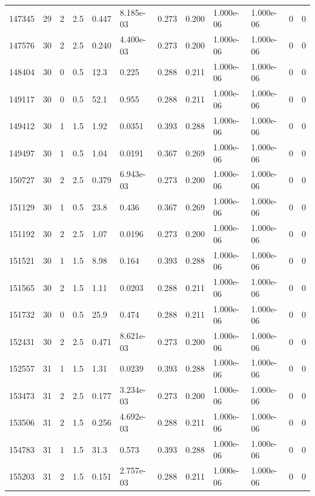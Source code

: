 \documentclass[preview]{standalone}
\begin{document}
{{{{{{{\begin{tabular}{L{1.2cm}C{1.2cm} C{0.3cm}C{0.5cm} C{1.4cm}C{1.4cm} C{1.4cm}C{1.4cm} C{1.6cm}C{1.6cm} C{1.6cm}C{1.6cm}}
  147345  &    29  & 2     & 2.5 &  0.447  & 8.185e-03  &  0.273&   0.200& 1.000e-06 & 1.000e-06   &  0 & 0  \\ 
  147576  &    30  & 2     & 2.5 &  0.240  & 4.400e-03  &  0.273&   0.200& 1.000e-06 & 1.000e-06   &  0 & 0  \\ 
  148404  &    30  & 0     & 0.5 &  12.3  & 0.225  &  0.288&   0.211& 1.000e-06 & 1.000e-06   &  0 & 0  \\ 
  149117  &    30  & 0     & 0.5 &  52.1  & 0.955  &  0.288&   0.211& 1.000e-06 & 1.000e-06   &  0 & 0  \\ 
  149412  &    30  & 1     & 1.5 &  1.92  & 0.0351  &  0.393&   0.288& 1.000e-06 & 1.000e-06   &  0 & 0  \\ 
  149497  &    30  & 1     & 0.5 &  1.04  & 0.0191  &  0.367&   0.269& 1.000e-06 & 1.000e-06   &  0 & 0  \\ 
  150727  &    30  & 2     & 2.5 &  0.379  & 6.943e-03  &  0.273&   0.200& 1.000e-06 & 1.000e-06   &  0 & 0  \\ 
  151129  &    30  & 1     & 0.5 &  23.8  & 0.436  &  0.367&   0.269& 1.000e-06 & 1.000e-06   &  0 & 0  \\ 
  151192  &    30  & 2     & 2.5 &  1.07  & 0.0196  &  0.273&   0.200& 1.000e-06 & 1.000e-06   &  0 & 0  \\ 
  151521  &    30  & 1     & 1.5 &  8.98  & 0.164  &  0.393&   0.288& 1.000e-06 & 1.000e-06   &  0 & 0  \\ 
  151565  &    30  & 2     & 1.5 &  1.11  & 0.0203  &  0.288&   0.211& 1.000e-06 & 1.000e-06   &  0 & 0  \\ 
  151732  &    30  & 0     & 0.5 &  25.9  & 0.474  &  0.288&   0.211& 1.000e-06 & 1.000e-06   &  0 & 0  \\ 
  152431  &    30  & 2     & 2.5 &  0.471  & 8.621e-03  &  0.273&   0.200& 1.000e-06 & 1.000e-06   &  0 & 0  \\ 
  152557  &    31  & 1     & 1.5 &  1.31  & 0.0239  &  0.393&   0.288& 1.000e-06 & 1.000e-06   &  0 & 0  \\ 
  153473  &    31  & 2     & 2.5 &  0.177  & 3.234e-03  &  0.273&   0.200& 1.000e-06 & 1.000e-06   &  0 & 0  \\ 
  153506  &    31  & 2     & 1.5 &  0.256  & 4.692e-03  &  0.288&   0.211& 1.000e-06 & 1.000e-06   &  0 & 0  \\ 
  154783  &    31  & 1     & 1.5 &  31.3  & 0.573  &  0.393&   0.288& 1.000e-06 & 1.000e-06   &  0 & 0  \\ 
  155203  &    31  & 2     & 1.5 &  0.151  & 2.757e-03  &  0.288&   0.211& 1.000e-06 & 1.000e-06   &  0 & 0  \\ 

\end{tabular}}}}}}}}
\end{document}
